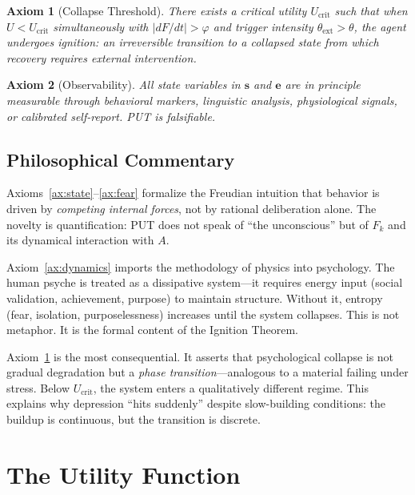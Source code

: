 \documentclass[12pt, a4paper]{article}
\newtheorem{axiom}{Axiom}[section]
\theoremstyle{remark}
\newcommand{\Ucrit}{U_{\text{crit}}}
\newcommand{\Fk}{F_k}
\begin{document}
\begin{axiom}[Collapse Threshold]\label{ax:collapse}
There exists a critical utility $\Ucrit$ such that when $U < \Ucrit$
simultaneously with $|dF/dt| > \varphi$ and trigger intensity
$\theta_{\text{ext}} > \theta$, the agent undergoes \emph{ignition}:
an irreversible transition to a collapsed state from which recovery
requires external intervention.
\end{axiom}

\begin{axiom}[Observability]\label{ax:observe}
All state variables in $\mathbf{s}$ and $\mathbf{e}$ are in principle
measurable through behavioral markers, linguistic analysis, physiological
signals, or calibrated self-report. PUT is falsifiable.
\end{axiom}

\subsection{Philosophical Commentary}

Axioms~\ref{ax:state}--\ref{ax:fear} formalize the Freudian intuition
that behavior is driven by \emph{competing internal forces}, not by
rational deliberation alone. The novelty is quantification: PUT does not
speak of ``the unconscious'' but of $\Fk$ and its dynamical interaction
with $A$.

Axiom~\ref{ax:dynamics} imports the methodology of physics into psychology.
The human psyche is treated as a dissipative system---it requires energy
input (social validation, achievement, purpose) to maintain structure.
Without it, entropy (fear, isolation, purposelessness) increases until
the system collapses. This is not metaphor. It is the formal content
of the Ignition Theorem.

Axiom~\ref{ax:collapse} is the most consequential. It asserts that
psychological collapse is not gradual degradation but a \emph{phase
transition}---analogous to a material failing under stress. Below
$\Ucrit$, the system enters a qualitatively different regime.
This explains why depression ``hits suddenly'' despite slow-building
conditions: the buildup is continuous, but the transition is discrete.


\section{The Utility Function}
\end{document}
